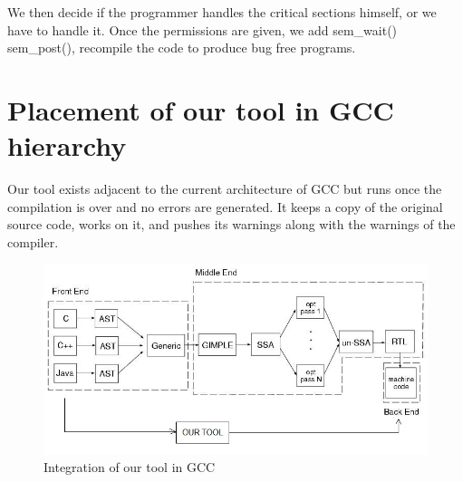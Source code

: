 We then decide if the programmer handles the critical sections himself, or we have to handle it. Once the permissions are given, we add sem\_wait() sem\_post(), recompile the code to produce bug free programs.

\section{Placement of our tool in GCC hierarchy}
Our tool exists adjacent to the current architecture of GCC but runs once the compilation is over and no errors are generated. It keeps a copy of the original source code, works on it, and pushes its warnings along with the warnings of the compiler.
\begin{figure}[H]
\centering
\includegraphics[scale=0.6]{gcc.jpg}
\caption{Integration of our tool in GCC}
\label{<<Label>>}
\end{figure}


